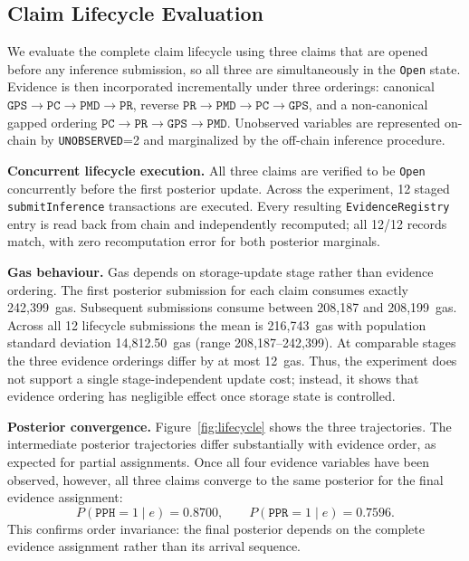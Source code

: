 \documentclass[journal]{IEEEtran}
\theoremstyle{definition}
\theoremstyle{remark}
\begin{document}
\subsection{Claim Lifecycle Evaluation}
\label{sec:exp-lifecycle}

We evaluate the complete claim lifecycle using three
claims that are opened before any inference submission,
so all three are simultaneously in the \texttt{Open}
state. Evidence is then incorporated incrementally under
three orderings: canonical
$\texttt{GPS}\to\texttt{PC}\to\texttt{PMD}\to\texttt{PR}$,
reverse
$\texttt{PR}\to\texttt{PMD}\to\texttt{PC}\to\texttt{GPS}$,
and a non-canonical gapped ordering
$\texttt{PC}\to\texttt{PR}\to\texttt{GPS}\to\texttt{PMD}$.
Unobserved variables are represented on-chain by
\texttt{UNOBSERVED}=2 and marginalized by the off-chain
inference procedure.

\noindent\textbf{Concurrent lifecycle execution.}
All three claims are verified to be \texttt{Open}
concurrently before the first posterior update.
Across the experiment, 12 staged
\texttt{submitInference} transactions are executed.
Every resulting \texttt{EvidenceRegistry} entry is read
back from chain and independently recomputed; all
12/12 records match, with zero recomputation error for
both posterior marginals.

\noindent\textbf{Gas behaviour.}
Gas depends on storage-update stage rather than evidence
ordering. The first posterior submission for each claim
consumes exactly 242{,}399~gas. Subsequent submissions
consume between 208{,}187 and 208{,}199~gas.
Across all 12 lifecycle submissions the mean is
216{,}743~gas with population standard deviation
14{,}812.50~gas
(range 208{,}187--242{,}399).
At comparable stages the three evidence orderings differ
by at most 12~gas. Thus, the experiment does not support
a single stage-independent update cost; instead, it shows
that evidence ordering has negligible effect once storage
state is controlled.

\noindent\textbf{Posterior convergence.}
Figure~\ref{fig:lifecycle} shows the three trajectories.
The intermediate posterior trajectories differ
substantially with evidence order, as expected for partial
assignments. Once all four evidence variables have been
observed, however, all three claims converge to the same
posterior for the final evidence assignment:
\[
P(\texttt{PPH}{=}1\mid e)=0.8700,
\qquad
P(\texttt{PPR}{=}1\mid e)=0.7596.
\]
This confirms order invariance: the final posterior depends
on the complete evidence assignment rather than its arrival
sequence.
\end{document}
